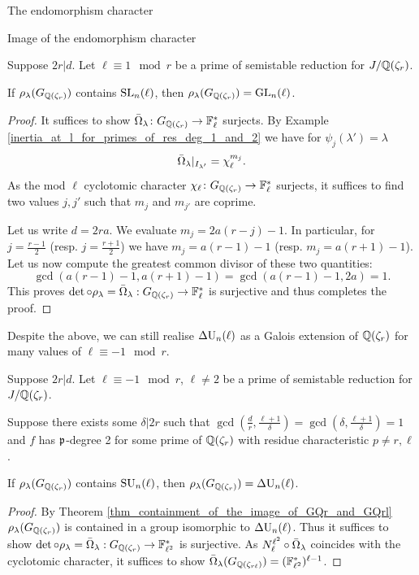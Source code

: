 \documentclass[11pt,a4paper]{article}
\newcommand{\Fl}{\mathbb{F}_\ell}
\newcommand{\Qr}{{\QQ(\zeta_r)}}
\newcommand{\GQr}{G_{\QQ(\zeta_{r})}}
\newcommand{\GQrl}{G_{\QQ(\zeta_{r\ell})}}
\begin{document}
\begin{section}{The endomorphism character}
\begin{subsection}{Image of the endomorphism character}
\begin{proposition}
\label{Prop_l_1_mod_r_IGP}
Suppose $2r|d$. Let  $\ell \equiv 1 \mod{r}$ be a prime of semistable reduction for $J/\Qr$. 

 
 If $\rho_\lambda(\GQr)$ contains $\SL_n(\ell) $, then $\rho_\lambda(\GQr) = \GL_n(\ell)$.
\end{proposition}


\begin{proof}
It suffices to show $\Bar{\Omega}_\lambda\colon \GQr \rightarrow \Fl^*$ surjects. By Example \ref{inertia_at_l_for_primes_of_res_deg_1_and_2} we have for $ \psi_j(\lambda') = \lambda$
\[
\Bar{\Omega}_\lambda|_{I_{\lambda'}} = \chi_\ell^{m_j}.
\]
As the mod $\ell$ cyclotomic character $\chi_\ell\colon \GQr \rightarrow \Fl^*$ surjects, it suffices to find two values $j,j'$ such that $m_j$ and $m_{j'}$ are coprime.

Let us write $d=2ra$. We evaluate $m_j = 2a(r-j)-1$. In particular, for $j= \frac{r-1}{2}$ (resp. $j = \frac{r+1}{2}$) we have $m_j = a(r-1)-1 $ (resp. $m_j = a(r+1)-1 $).
Let us now compute the greatest common divisor of these two quantities:
\[\gcd(a(r-1)-1, a(r+1)-1) = \gcd(a(r-1)-1, 2a) = 1.\]
This proves $\det \circ \rho_\lambda = \Bar{\Omega}_\lambda: \GQr \rightarrow \Fl^*$ is surjective and thus completes the proof. 
\end{proof}

Despite the above, we can still realise $\DU_n(\ell)$ as a Galois extension of $\Qr$ for many values of $\ell \equiv -1 \mod{r}$.

\begin{proposition}
\label{prop_DU_image}
Suppose $2r|d$. Let $\ell \equiv -1 \mod{r}$, $\ell \neq 2$ be a prime of semistable reduction for $J/\Qr$.

Suppose there exists some $\delta|2r$ such that $\gcd(\frac{d}{r},\frac{\ell+1}{\delta})= \gcd(\delta, \frac{\ell+1}{\delta})=1$ and $f$ has $\mathfrak{p}$-degree 2 for some prime of $\Qr$ with residue characteristic $p \neq r,\ell$.

If $\rho_\lambda(\GQr)$ contains $\SU_n(\ell)$, then $\rho_\lambda(\GQr) = \DU_n(\ell)$.
\end{proposition}


\begin{proof}
By Theorem \ref{thm_containment_of_the_image_of_GQr_and_GQrl} $\rho_\lambda(\GQr)$ is contained in a group isomorphic to $ \DU_n(\ell)$.
Thus it suffices to show $\det \circ \rho_\lambda = \Bar{\Omega}_\lambda : \GQr \rightarrow \FF_{\ell^2}^*$ is surjective. As $N^{\ell^2}_{\ell} \circ \Bar{\Omega}_\lambda$ coincides with the cyclotomic character, it suffices to show $\Bar{\Omega}_\lambda(\GQrl) = (\FF_{\ell^2}^*)^{\ell -1}$.


\end{proof}
\end{subsection}
\end{section}
\end{document}
